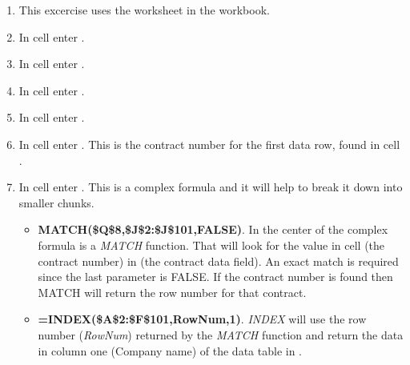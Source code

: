 \begin{enumerate}
	\item This excercise uses the  worksheet in the  workbook.
	\item In cell  enter .
	\item In cell  enter .
	\item In cell  enter .
	\item In cell  enter .
	\item In cell  enter . This is the contract number for the first data row, found in cell .
	\item In cell  enter . This is a complex formula and it will help to break it down into smaller chunks. 
	
	\begin{itemize}
		\item \textbf{MATCH(\$Q\$8,\$J\$2:\$J\$101,FALSE)}. In the center of the complex formula is a \textit{MATCH} function. That will look for the value in cell  (the contract number) in  (the contract data field). An exact match is required since the last parameter is FALSE. If the contract number is found then MATCH will return the row number for that contract.
		\item \textbf{=INDEX(\$A\$2:\$F\$101,RowNum,1)}. \textit{INDEX} will use the row number (\textit{RowNum}) returned by the \textit{MATCH} function and return the data in column one (Company name) of the data table in .
	\end{itemize}
		

\end{enumerate}
